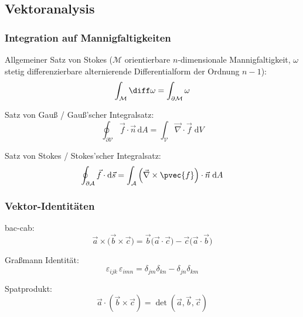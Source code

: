 \documentclass[11pt]{article}
\numberwithin{equation}{section}
\begin{document}
		\subsection{Vektoranalysis}
			\subsubsection{Integration auf Mannigfaltigkeiten}
				\noindent
				Allgemeiner Satz von Stokes ($\mathcal{M}$ orientierbare $n$-dimensionale Mannigfaltigkeit, $\omega$ stetig differenzierbare alternierende Differentialform der Ordnung $n-1$):
				\begin{equation}
					\int_\mathcal{M} \diff \omega = \int_{\partial\mathcal{M}} \omega
				\end{equation}

				\noindent
				Satz von Gauß / Gauß'scher Integralsatz:
				\begin{equation}
					\oint_{\partial\mathcal{V}}\vec{f}\cdot\vec{n}\,\mathrm{d}A=\int_{\mathcal{V}}\vec{\nabla}\cdot\vec{f}\;\mathrm{d}V
				\end{equation}

				\noindent
				Satz von Stokes / Stokes'scher Integralsatz:
				\begin{equation}
					\oint_{\partial\mathcal{A}}\vec{f}\cdot\mathrm{d}\vec{s}=\int_{\mathcal{A}}\left(\vec{\nabla}\times\pvec{f}\right)\cdot\vec{n}\;\mathrm{d}A
				\end{equation}

			\subsubsection{Vektor-Identitäten}
				\noindent
				bac-cab:
				\begin{equation}
					\vec{a}\times\big(\vec{b}\times\vec{c}\big) = \vec{b}\big(\vec{a}\cdot\vec{c}\big) - \vec{c}\big(\vec{a}\cdot\vec{b}\big)
				\end{equation}

				\noindent
				Graßmann Identität:
				\begin{equation}
					\varepsilon_{ijk}\,\varepsilon_{imn}=\delta_{jm}\delta_{kn}-\delta_{jn}\delta_{km}
				\end{equation}

				\noindent
				Spatprodukt:
				\begin{equation}
					\vec{a}\cdot\left(\vec{b}\times\vec{c}\right) = \det\left(\vec{a},\vec{b},\vec{c}\right)
				\end{equation}
\end{document}
